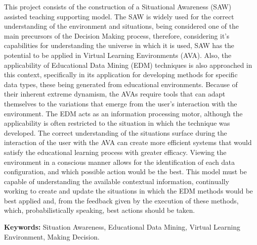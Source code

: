 \begin{resumo}[Abstract]
This project consists of the construction of a Situational Awareness (SAW) assisted teaching supporting model. The SAW is widely used for the correct understanding of the environment and situations, being considered one of the main precursors of the Decision Making process, therefore, considering it's capabilities for understanding the universe in which it is used, SAW has the potential to be applied in Virtual Learning Environments (AVA). Also, the applicability of Educational Data Mining (EDM) techniques is also approached in this context, specifically in its application for developing methods for specific data types, these being generated from educational environments. Because of their inherent extreme dynamism, the AVAs require tools that can adapt themselves to the variations that emerge from the user's interaction with the environment. The EDM acts as an information processing motor, although the applicability is often restricted to the situation in which the technique was developed. The correct understanding of the situations surface during the interaction of the user with the AVA can create more efficient systems that would satisfy the educational learning process with greater efficacy. Viewing the environment in a conscious manner allows for the identification of each data configuration, and which possible action would be the best. This model must be capable of understanding the available contextual information, continually working to create and update the situations in which the EDM methods would be best applied and, from the feedback given by the execution of these methods, which, probabilistically speaking, best actions should be taken.

\noindent \textbf{Keywords:} Situation Awareness, Educational Data Mining, Virtual Learning Environment, Making Decision.
\end{resumo}
